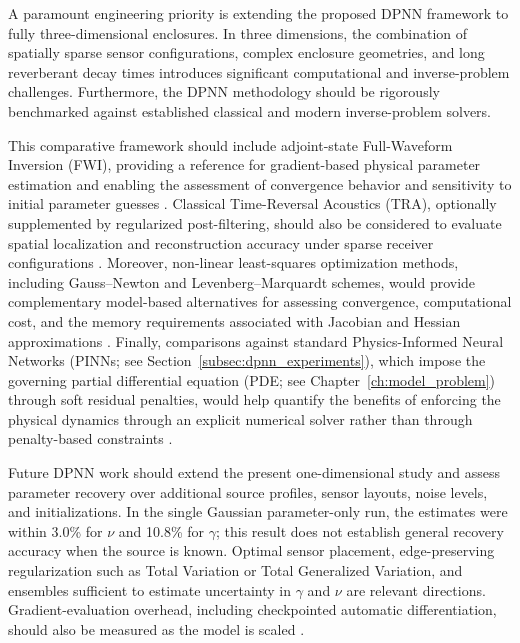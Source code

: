 \documentclass{Configuration_Files/PoliMi3i_thesis}
\newif\ifshowthesischanges
\DeclareRobustCommand{\thesischange}[2]{%
    \ifshowthesischanges
        \textcolor{#1}{#2}%
    \else
        #2%
    \fi
}
\def\thesischange#1#2{#2}%
\begin{document}
\thesischange{red}{A paramount engineering priority is extending the proposed DPNN framework to fully three-dimensional enclosures. In three dimensions, the combination of spatially sparse sensor configurations, complex enclosure geometries, and long reverberant decay times introduces significant computational and inverse-problem challenges. Furthermore, the DPNN methodology should be rigorously benchmarked against established classical and modern inverse-problem solvers.}

\thesischange{red}{This comparative framework should include adjoint-state Full-\allowbreak Waveform Inversion (FWI), providing a reference for gradient-based physical parameter estimation and enabling the assessment of convergence behavior and sensitivity to initial parameter guesses \citep{plessix_adjoint_2006,pratt_gauss_newton_1998}. Classical Time-Reversal Acoustics (TRA), optionally supplemented by regularized post-filtering, should also be considered to evaluate spatial localization and reconstruction accuracy under sparse receiver configurations \citep{fink_time_1992,kahana_time_2022}. Moreover, non-linear least-squares optimization methods, including Gauss--Newton and Levenberg--Marquardt schemes, would provide complementary model-based alternatives for assessing convergence, computational cost, and the memory requirements associated with Jacobian and Hessian approximations \citep{pratt_gauss_newton_1998,marquardt_1963}. Finally, comparisons against standard Physics-Informed Neural Networks (PINNs; see Section~\ref{subsec:dpnn_experiments}), which impose the governing partial differential equation (PDE; see Chapter~\ref{ch:model_problem}) through soft residual penalties, would help quantify the benefits of enforcing the physical dynamics through an explicit numerical solver rather than through penalty-based constraints \citep{raissi_pinn_2019,olivieri_physics-informed_2024}.}

\thesischange{red}{Future DPNN work should extend the present one-dimensional study and assess parameter recovery over additional source profiles, sensor layouts, noise levels, and initializations. In the single Gaussian parameter-only run, the estimates were within 3.0\% for $\nu$ and 10.8\% for $\gamma$; this result does not establish general recovery accuracy when the source is known. Optimal sensor placement, edge-preserving regularization such as Total Variation or Total Generalized Variation, and ensembles sufficient to estimate uncertainty in $\gamma$ and $\nu$ are relevant directions. Gradient-evaluation overhead, including checkpointed automatic differentiation, should also be measured as the model is scaled \citep{griewank_revolve_2000}.}
\end{document}
